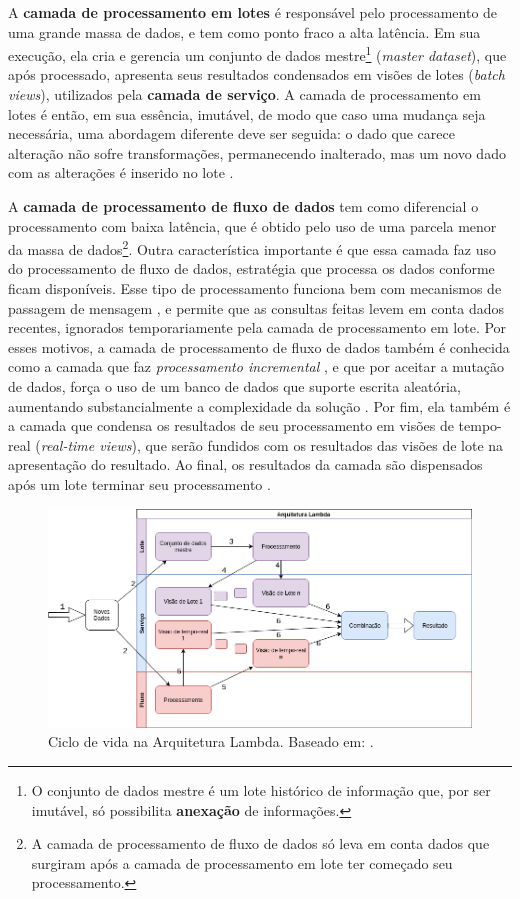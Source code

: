 A \textbf{camada de processamento em lotes} é responsável pelo processamento de uma grande
massa de dados, e tem como ponto fraco a alta latência. Em sua execução, ela
cria e gerencia um conjunto de dados mestre\footnote{O conjunto de dados mestre
é um lote histórico de informação que, por ser imutável, só possibilita
\textbf{anexação} de informações.} (\textit{master dataset}), que após processado,
apresenta seus resultados condensados em visões de lotes (\textit{batch views}),
utilizados pela \textbf{camada de serviço}.  A camada de processamento em lotes
é então, em sua essência, imutável, de modo que caso uma mudança seja necessária,
uma abordagem diferente deve ser seguida: o dado que carece alteração não sofre
transformações, permanecendo inalterado, mas um novo dado com as alterações é
inserido no lote \cite{marz2015}.

A \textbf{camada de processamento de fluxo de dados} tem como diferencial o
processamento com baixa latência, que é obtido pelo uso de uma parcela menor da
massa de dados\footnote{A camada de processamento de fluxo de dados só leva em
conta dados que surgiram após a camada de processamento em lote ter começado seu
processamento.}. Outra característica importante
é que essa camada faz uso do processamento de fluxo de dados, estratégia que
processa os dados conforme ficam disponíveis. Esse tipo de
processamento funciona bem com mecanismos de passagem de mensagem
\cite{marz2015}, e permite que as consultas feitas levem em conta dados
recentes, ignorados temporariamente pela camada de processamento em lote. Por esses
motivos, a camada de processamento de fluxo de dados também é conhecida como a
camada que faz \textit{processamento incremental} \cite{marz2015}, e que por aceitar a mutação
de dados, força o uso de um banco de dados que suporte escrita aleatória,
aumentando substancialmente a complexidade da solução \cite{marz2015}. Por
fim, ela também é a camada que condensa os resultados de seu processamento em
visões de tempo-real (\textit{real-time views}), que serão fundidos com os resultados das
visões de lote na apresentação do resultado. Ao final, os resultados
da camada são dispensados após um lote terminar seu processamento \cite{marz2015}.

\begin{figure}[hbt]
  \centering
    \includegraphics[width=\textwidth]{figuras/lambdaarchitecture.png}
    \caption{Ciclo de vida na Arquitetura Lambda. Baseado em: .}
  \label{fig:lambda-lifecycle}
\end{figure}

